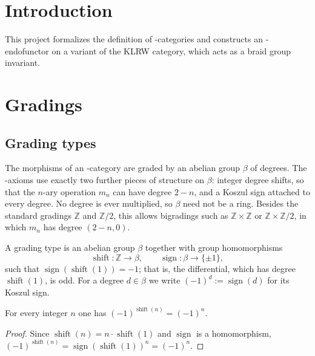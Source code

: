 

\chapter{Introduction}

This project formalizes the definition of \Ainf{}-categories and constructs an
\Ainf{}-endofunctor on a variant of the KLRW category, which acts as a braid group invariant.



\chapter{Gradings}

\section{Grading types}

The morphisms of an \Ainf{}-category are graded by an abelian group $\beta$ of
degrees. The \Ainf{}-axioms use exactly two further pieces of structure on
$\beta$: integer degree shifts, so that the $n$-ary operation $m_n$ can have
degree $2-n$, and a Koszul sign attached to every degree. No degree is ever
multiplied, so $\beta$ need not be a ring. Besides the standard gradings
$\mathbb{Z}$ and $\mathbb{Z}/2$, this allows bigradings such as
$\mathbb{Z}\times\mathbb{Z}$ or $\mathbb{Z}\times\mathbb{Z}/2$, in which $m_n$
has degree $(2-n,0)$.

\begin{definition}
\label{AInfinityTheory.GradingType}
\leanok
A grading type is an abelian group $\beta$ together with group homomorphisms
\[
  \operatorname{shift} : \mathbb{Z} \to \beta,
  \qquad
  \operatorname{sign} : \beta \to \{\pm 1\},
\]
such that $\operatorname{sign}(\operatorname{shift}(1)) = -1$; that is, the
differential, which has degree $\operatorname{shift}(1)$, is odd. For a degree
$d \in \beta$ we write $(-1)^d := \operatorname{sign}(d)$ for its Koszul sign.
\end{definition}

\begin{lemma}
\label{AInfinityTheory.sign_shift}
\leanok
{}
For every integer $n$ one has $(-1)^{\operatorname{shift}(n)} = (-1)^n$.
\end{lemma}
\begin{proof}
\leanok
Since $\operatorname{shift}(n) = n \cdot \operatorname{shift}(1)$ and
$\operatorname{sign}$ is a homomorphism,
$(-1)^{\operatorname{shift}(n)} = \operatorname{sign}(\operatorname{shift}(1))^n = (-1)^n$.
\end{proof}

